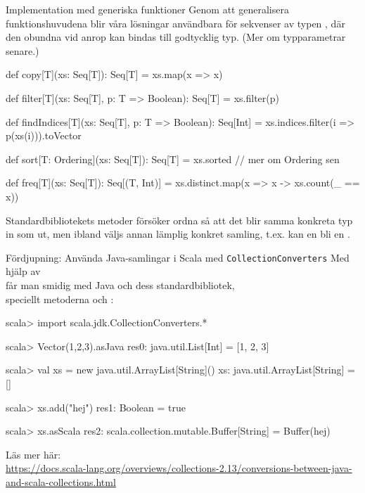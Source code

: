 \begin{Slide}{Implementation med generiska funktioner}\SlideFontSmall
Genom att generalisera funktionshuvudena blir våra lösningar användbara för  sekvenser av typen , där den obundna   vid anrop kan bindas till godtycklig typ. (Mer om typparametrar senare.)
\begin{Code}
def copy[T](xs: Seq[T]): Seq[T] = xs.map(x => x)

def filter[T](xs: Seq[T], p: T => Boolean): Seq[T] = xs.filter(p)

def findIndices[T](xs: Seq[T], p: T => Boolean): Seq[Int] =
  xs.indices.filter(i => p(xs(i))).toVector

def sort[T: Ordering](xs: Seq[T]): Seq[T] = xs.sorted // mer om Ordering sen

def freq[T](xs: Seq[T]): Seq[(T, Int)] =
  xs.distinct.map(x => x -> xs.count(_ == x))
\end{Code}
\pause
Standardbibliotekets metoder försöker ordna så att det blir samma konkreta typ in som ut, men ibland väljs annan lämplig konkret samling, t.ex. kan en  bli en . 
\end{Slide}

\begin{Slide}{Fördjupning: Använda Java-samlingar i Scala med \texttt{CollectionConverters}}\SlideFontSmall
Med hjälp av  \\
får man smidig  med Java och dess standardbibliotek, \\
speciellt metoderna  och :
\begin{REPL}
scala> import scala.jdk.CollectionConverters.*

scala> Vector(1,2,3).asJava
res0: java.util.List[Int] = [1, 2, 3]

scala> val xs = new java.util.ArrayList[String]()
xs: java.util.ArrayList[String] = []

scala> xs.add("hej")
res1: Boolean = true

scala> xs.asScala
res2: scala.collection.mutable.Buffer[String] = Buffer(hej)
\end{REPL}

\noindent Läs mer här: %
\ifkompendium\\\fi%
\scriptsize%
\url{https://docs.scala-lang.org/overviews/collections-2.13/conversions-between-java-and-scala-collections.html}

\end{Slide}


